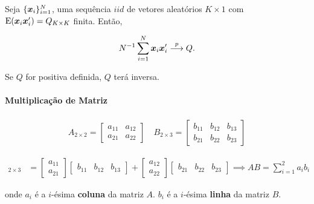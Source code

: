 \documentclass[11pt, oneside, a4paper, article]{article}
\numberwithin{equation}{section}
\begin{document}
\begin{description}
\begin{description}
\begin{def1}
Seja $\{\boldsymbol{x}_{i}\}_{i=1}^{N}$, uma sequência $iid$ de vetores aleatórios $K \times 1$ com $\text{E}(\boldsymbol{x}_{i} \boldsymbol{x}_{i}') = Q_{K \times K}$ finita.
Então, 

\vspace{-1 em}
\begin{align*}
N^{-1} \sum_{i=1}^{N}
\boldsymbol{x}_{i} \boldsymbol{x}_{i}'
 \overset{p}{\longrightarrow}  Q.
\end{align*}

Se $Q$ for positiva definida, $Q$ terá inversa.
\end{def1}

\paragraph{Multiplicação de Matriz}

\begin{align*}
A_{2 \times 2} =
\begin{bmatrix}
	a_{11} & a_{12} \\
	a_{21} & a_{22}		
\end{bmatrix}
\quad
B_{2 \times 3} =
\begin{bmatrix}
	b_{11} & b_{12} & b_{13} \\
	b_{21} & b_{22} & b_{23}		
\end{bmatrix}
\end{align*}

\begin{align*}
[AB]_{2 \times 3} &=
\begin{bmatrix}
	a_{11} \\ a_{21}
\end{bmatrix}
\begin{bmatrix}
	b_{11} & b_{12} & b_{13}
\end{bmatrix}
+
\begin{bmatrix}
	a_{12} \\ a_{22}
\end{bmatrix}
\begin{bmatrix}
	b_{21} & b_{22} & b_{23}
\end{bmatrix}
\implies
AB = \sum_{i=1}^{2} a_{i}b_{i}
\end{align*}

\noindent
onde
$a_{i}$ é a $i$-ésima \textbf{coluna} da matriz $A$.
$b_{i}$ é a $i$-ésima \textbf{linha} da matriz $B$.


\end{description}
\end{description}
\end{document}
